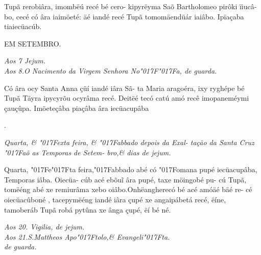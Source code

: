 \documentclass[openany,titlepage,12pt]{book}
\newcommand{\lgS}{\char"017F}
\newcommand{\lgSS}{\char"017F\char"017F}
\begin{document}
{\hspace*{-2ex}Tupã rerobiâra, imombëú recé bé cero-
kipyrëyma Saõ Bartholomeo pirôki ïiucâ-
bo, cecé có âra iaimöeté: äé iandé recé Tupã
tomomäendüár iaiâbo. Ipïaçaba tiaiecüacúb.}

\vspace*{2ex}
\begin{center}
    {EM SETEMBRO.\\}
\end{center}

\begin{center}
    \textit{\footnotesize Aos 7 Jejum.\\    
    Aos 8.O Nacimento da Virgem Senhora No\lgSS a,
    de guarda.}
\end{center}

{\hspace*{-2ex}Có âra ocy Santa Anna çüí iandé iâra Sã-
ta Maria aragoéra, ixy ryghépe bé Tupã\linebreak
Täyra ipycyrõu ocyrâma recé. Deitëé tecó\linebreak
catú amó recê imopaneméymi çauçûpa.\linebreak
Imöeteçâba piaçâba âra iecüacupâba\\}

\hspace*{-5ex}\begin{minipage}[t]{2ex}
    .
\end{minipage}
\hspace*{1ex}\begin{minipage}[t]{0.96\linewidth}
    \textit{
    \footnotesize \hspace*{-3.5ex}Quarta, \& \lgS exta feira, \& \lgS abbado depois da Exal-
    tação da Santa Cruz \lgS aõ as Temporas de Setem-
    bro,\& dias de jejum.
    }
    \newline\vspace*{4pt}
\end{minipage}


{\hspace*{-2ex}Quarta, \lgS e\lgS ta feira,\lgS abbado abé có \lgS omana
pupé iecüacupâba, Temporas iâba. Oiecüa-\linebreak
cúb acé ebõu\~i âra pupé, taxe möingobé pu-
cú Tupã, tomëéng abé xe remiurâma xebo
oiâbo.Onhëangherecó bé acé amóäé bäé re-
cé oiecüacûboné , tacepymëéng iandé iâra
çupé xe angaipábetá recé, ëíne, tamoberáb
Tupã robá pytûna xe ânga çupé, ëí bé né.}


\begin{center}
    \textit{\footnotesize Aos 20. Vigilia, de jejum.\\
    Aos 21.S.Mattheos Apo\lgS tolo,\& Evangeli\lgS ta.\\
    de guarda.}
\end{center}
\end{document}

